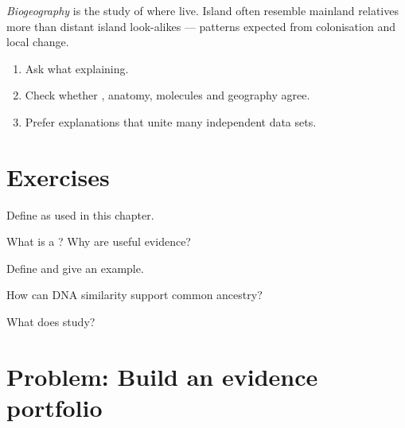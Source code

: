\begin{definition}[Biogeography]\label{def:g8:evolution:biogeo}
\emph{Biogeography} is the study of where  live.
Island  often resemble mainland relatives more than distant island
look-alikes --- patterns expected from colonisation and local change.
\end{definition}

\begin{method}\label{met:g8:evolution:weigh}
\begin{enumerate}
  \item Ask what   explaining.
  \item Check whether , anatomy, molecules and geography agree.
  \item Prefer explanations that unite many independent data sets.
\end{enumerate}
\end{method}

\section{Exercises}

\begin{exercise}[$\star$]\label{exo:g8:evolution:1}
Define  as used in this chapter.
\end{exercise}

\begin{exercise}[$\star$]\label{exo:g8:evolution:2}
What is a ? Why are  useful evidence?
\end{exercise}

\begin{exercise}[$\star$]\label{exo:g8:evolution:3}
Define  and give an example.
\end{exercise}

\begin{exercise}[$\star$]\label{exo:g8:evolution:4}
How can DNA similarity support common ancestry?
\end{exercise}

\begin{exercise}[$\star$]\label{exo:g8:evolution:5}
What does  study?
\end{exercise}

\section{Problem: Build an evidence portfolio}

